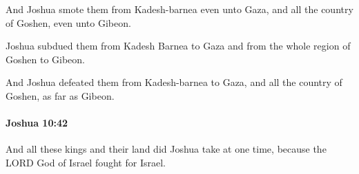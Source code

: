			\begin{versebox}
					\item[BHS] 
					\item[ASV] And Joshua smote them from Kadesh-barnea even unto Gaza, and all the country of Goshen, even unto Gibeon.
					\item[NIV] Joshua subdued them from Kadesh Barnea to Gaza and from the whole region of Goshen to Gibeon.
					\item[NRSV] And Joshua defeated them from Kadesh-barnea to Gaza, and all the country of Goshen, as far as Gibeon.
			\end{versebox}

		\paragraph{Joshua 10:42} %
			\label{JOSHUA-10-42}

			And all these kings and their land did Joshua take at one time, because the LORD God of Israel fought for Israel.

